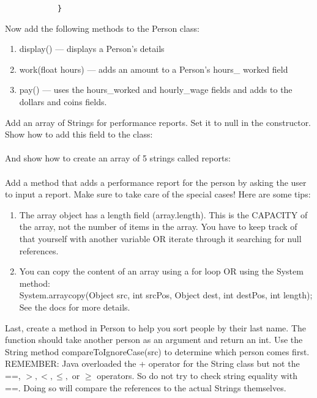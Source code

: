\documentclass[../../main.tex]{subfiles}
\begin{document}
\begin{steps}
      \begin{verbatim}
            }
      \end{verbatim}
      \item Now add the following methods to the Person class:
         \begin{enumerate}[label=\Alph*.]
            \item display() --- displays a Person's details
            \item work(float hours) --- adds an amount to a Person's hours_
               worked field
            \item pay() --- uses the hours_worked and hourly_wage
               fields and adds to the dollars and coins fields.
         \end{enumerate}
      \item Add an array of Strings for performance reports.  Set it to null in the constructor.
         Show how to add this field to the class:
         \vspace{.5cm}\\
         \underline{\hspace{15cm}}\\
         And show how to create an array of 5 strings called reports:
         \vspace{.5cm}\\
         \underline{\hspace{15cm}}\\
         Add a method that adds a performance report for the person by asking the user to
         input a report. Make sure to take care of the special cases! Here are some tips:
         \begin{enumerate}[label=\Alph*.]
            \item The array object has a length field (array.length). This is the CAPACITY
               of the array, not the number of items in the array. You have to keep track
               of that yourself with another variable OR iterate through it searching for
               null references.
            \item You can copy the content of an array using a for loop OR using the System
               method:\\
               System.arraycopy(Object src, int srcPos, Object dest, int destPos, int length);\\
               See the docs for more details.
         \end{enumerate} 
      \item Last, create a method in Person to help you sort people by their last name.
         The function should take another person as an argument and return an int.
         Use the String method
         compareToIgnoreCase(src) to determine which person comes first.\\
            REMEMBER: Java overloaded the + operator for the String class but not the ==,
            $>, <, \leq,$ or $\geq$ operators. So do not try to check string equality with ==.
            Doing so will compare the references to the actual Strings themselves.
   \end{steps}
   
\end{document}
